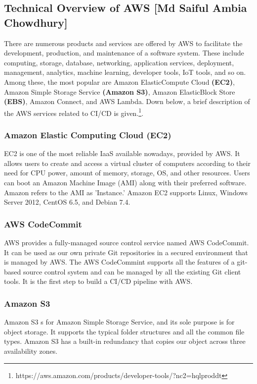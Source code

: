 
%
\subsection{Technical Overview of AWS [Md Saiful Ambia Chowdhury]}
%
There are numerous products and services are offered by AWS to facilitate the development, production, and maintenance of a software system. These include computing, storage, database, networking, application services, deployment, management, analytics, machine learning, developer tools, IoT tools, and so on. Among these, the most popular are Amazon ElasticCompute Cloud \textbf{(EC2)}, Amazon Simple Storage Service \textbf{(Amazon S3)}, Amazon ElasticBlock Store \textbf{(EBS)}, Amazon Connect, and AWS Lambda. Down below, a brief description of the AWS services related to CI/CD is given.\footnote{https://aws.amazon.com/products/developer-tools/?nc2=h\textunderscore ql\textunderscore prod\textunderscore dt}.

\subsubsection{Amazon Elastic Computing Cloud (EC2)}
%
EC2 is one of the most reliable IaaS available nowadays, provided by AWS. It allows users to create and access a virtual cluster of computers according to their need for CPU power, amount of memory, storage, OS, and other resources. Users can boot an Amazon Machine Image (AMI) along with their preferred software. Amazon refers to the AMI as 'Instance.' Amazon EC2 supports Linux, Windows Server 2012, CentOS 6.5, and Debian 7.4.
%

\subsubsection{AWS CodeCommit}
%
AWS provides a fully-managed source control service named AWS CodeCommit. It can be used as our own private Git repositories in a secured environment that is managed by AWS. The AWS CodeCommint supports all the features of a git-based source control system and can be managed by all the existing Git client tools. It is the first step to build a CI/CD pipeline with AWS.  
%

\subsubsection{Amazon S3}
%
Amazon S3 s for Amazon Simple Storage Service, and its sole purpose is for object storage. It supports the typical folder structures and all the common file types. Amazon S3 has a built-in redundancy that copies our object across three availability zones.
%

